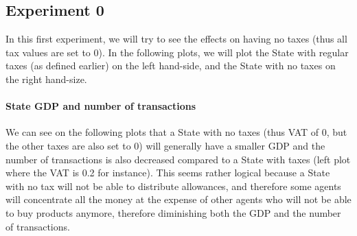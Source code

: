     \subsection{Experiment 0}
    In this first experiment, we will try to see the effects on having no taxes (thus all tax values are set to 0). In the following plots, we will plot the State with regular taxes (as defined earlier) on the left hand-side, and the State with no taxes on the right hand-size. 

    \paragraph{State GDP and number of transactions}

    We can see on the following plots that a State with no taxes (thus VAT of 0, but the other taxes are also set to 0) will generally have a smaller GDP and the number of transactions is also decreased compared to a State with taxes (left plot where the VAT is 0.2 for instance). This seems rather logical because a State with no tax will not be able to distribute allowances, and therefore some agents will concentrate all the money at the expense of other agents who will not be able to buy products anymore, therefore diminishing both the GDP and the number of transactions.
